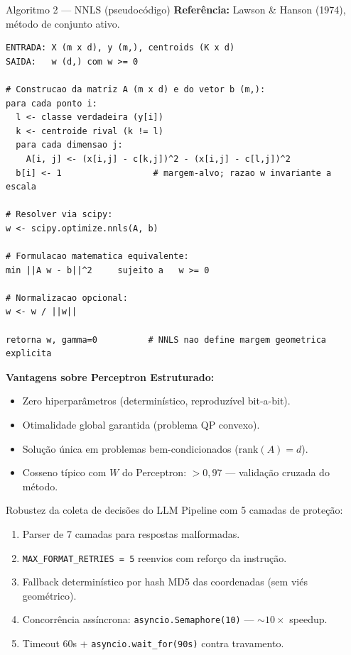 \documentclass[aspectratio=169,10pt]{beamer}
\begin{document}
\begin{frame}[fragile]{Algoritmo 2 --- NNLS (pseudoc\'odigo)}
  \tiny
  \textbf{Refer\^encia:} Lawson \& Hanson (1974), m\'etodo de conjunto ativo.
\begin{verbatim}
ENTRADA: X (m x d), y (m,), centroids (K x d)
SAIDA:   w (d,) com w >= 0

# Construcao da matriz A (m x d) e do vetor b (m,):
para cada ponto i:
  l <- classe verdadeira (y[i])
  k <- centroide rival (k != l)
  para cada dimensao j:
    A[i, j] <- (x[i,j] - c[k,j])^2 - (x[i,j] - c[l,j])^2
  b[i] <- 1                  # margem-alvo; razao w invariante a escala

# Resolver via scipy:
w <- scipy.optimize.nnls(A, b)

# Formulacao matematica equivalente:
min ||A w - b||^2     sujeito a   w >= 0

# Normalizacao opcional:
w <- w / ||w||

retorna w, gamma=0          # NNLS nao define margem geometrica explicita
\end{verbatim}
  \textbf{Vantagens sobre Perceptron Estruturado:}
  \begin{itemize}\setlength\itemsep{0.05em}
    \item Zero hiperpar\^ametros (determin\'istico, reproduz\'ivel bit-a-bit).
    \item Otimalidade global garantida (problema QP convexo).
    \item Solu\c{c}\~ao \'unica em problemas bem-condicionados ($\text{rank}(A)=d$).
    \item Cosseno t\'ipico com $W$ do Perceptron: $> 0{,}97$ --- valida\c{c}\~ao cruzada do m\'etodo.
  \end{itemize}
\end{frame}

\begin{frame}{Robustez da coleta de decis\~oes do LLM}
  \footnotesize
  Pipeline com 5 camadas de prote\c{c}\~ao:
  \begin{enumerate}
    \item Parser de 7 camadas para respostas malformadas.
    \item \texttt{MAX\_FORMAT\_RETRIES = 5} reenvios com refor\c{c}o da instru\c{c}\~ao.
    \item Fallback determin\'istico por hash MD5 das coordenadas (sem vi\'es geom\'etrico).
    \item Concorr\^encia ass\'incrona: \texttt{asyncio.Semaphore(10)} --- $\sim 10\times$ speedup.
    \item Timeout 60s + \texttt{asyncio.wait\_for(90s)} contra travamento.
  \end{enumerate}
\end{frame}
\end{document}
